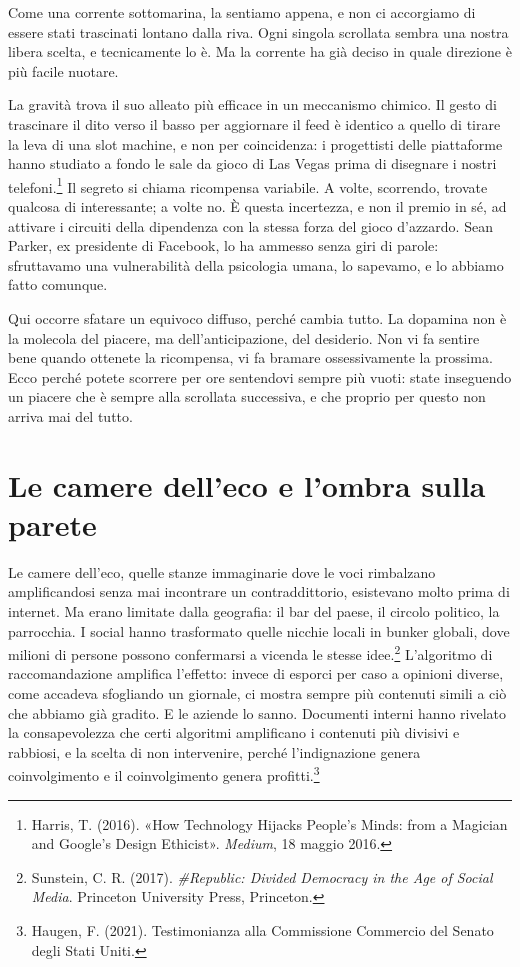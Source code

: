 Come una corrente sottomarina, la sentiamo appena, e non ci accorgiamo di essere stati trascinati lontano dalla riva. Ogni singola scrollata sembra una nostra libera scelta, e tecnicamente lo è. Ma la corrente ha già deciso in quale direzione è più facile nuotare.

\label{sec:p2c11-dopamina}
La gravità trova il suo alleato più efficace in un meccanismo chimico. Il gesto di trascinare il dito verso il basso per aggiornare il feed è identico a quello di tirare la leva di una slot machine, e non per coincidenza: i progettisti delle piattaforme hanno studiato a fondo le sale da gioco di Las Vegas prima di disegnare i nostri telefoni.\footnote{Harris, T. (2016). «How Technology Hijacks People's Minds: from a Magician and Google's Design Ethicist». \textit{Medium}, 18 maggio 2016.} Il segreto si chiama ricompensa variabile. A volte, scorrendo, trovate qualcosa di interessante; a volte no. È questa incertezza, e non il premio in sé, ad attivare i circuiti della dipendenza con la stessa forza del gioco d'azzardo. Sean Parker, ex presidente di Facebook, lo ha ammesso senza giri di parole: sfruttavamo una vulnerabilità della psicologia umana, lo sapevamo, e lo abbiamo fatto comunque.

Qui occorre sfatare un equivoco diffuso, perché cambia tutto. La dopamina non è la molecola del piacere, ma dell'anticipazione, del desiderio. Non vi fa sentire bene quando ottenete la ricompensa, vi fa bramare ossessivamente la prossima. Ecco perché potete scorrere per ore sentendovi sempre più vuoti: state inseguendo un piacere che è sempre alla scrollata successiva, e che proprio per questo non arriva mai del tutto.

\section{Le camere dell'eco e l'ombra sulla parete}
\label{sec:p2c11-camere-eco}

Le camere dell'eco, quelle stanze immaginarie dove le voci rimbalzano amplificandosi senza mai incontrare un contraddittorio, esistevano molto prima di internet. Ma erano limitate dalla geografia: il bar del paese, il circolo politico, la parrocchia. I social hanno trasformato quelle nicchie locali in bunker globali, dove milioni di persone possono confermarsi a vicenda le stesse idee.\footnote{Sunstein, C. R. (2017). \textit{\#Republic: Divided Democracy in the Age of Social Media}. Princeton University Press, Princeton.} L'algoritmo di raccomandazione amplifica l'effetto: invece di esporci per caso a opinioni diverse, come accadeva sfogliando un giornale, ci mostra sempre più contenuti simili a ciò che abbiamo già gradito. E le aziende lo sanno. Documenti interni hanno rivelato la consapevolezza che certi algoritmi amplificano i contenuti più divisivi e rabbiosi, e la scelta di non intervenire, perché l'indignazione genera coinvolgimento e il coinvolgimento genera profitti.\footnote{Haugen, F. (2021). Testimonianza alla Commissione Commercio del Senato degli Stati Uniti.}

